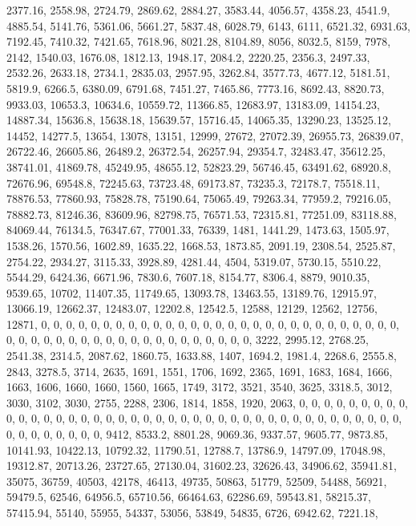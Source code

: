 \documentclass[
]{article}
\begin{document}
2377.16, 2558.98, 2724.79, 2869.62, 2884.27, 3583.44, 4056.57, 4358.23,
4541.9, 4885.54, 5141.76, 5361.06, 5661.27, 5837.48, 6028.79, 6143,
6111, 6521.32, 6931.63, 7192.45, 7410.32, 7421.65, 7618.96, 8021.28,
8104.89, 8056, 8032.5, 8159, 7978, 2142, 1540.03, 1676.08, 1812.13,
1948.17, 2084.2, 2220.25, 2356.3, 2497.33, 2532.26, 2633.18, 2734.1,
2835.03, 2957.95, 3262.84, 3577.73, 4677.12, 5181.51, 5819.9, 6266.5,
6380.09, 6791.68, 7451.27, 7465.86, 7773.16, 8692.43, 8820.73, 9933.03,
10653.3, 10634.6, 10559.72, 11366.85, 12683.97, 13183.09, 14154.23,
14887.34, 15636.8, 15638.18, 15639.57, 15716.45, 14065.35, 13290.23,
13525.12, 14452, 14277.5, 13654, 13078, 13151, 12999, 27672, 27072.39,
26955.73, 26839.07, 26722.46, 26605.86, 26489.2, 26372.54, 26257.94,
29354.7, 32483.47, 35612.25, 38741.01, 41869.78, 45249.95, 48655.12,
52823.29, 56746.45, 63491.62, 68920.8, 72676.96, 69548.8, 72245.63,
73723.48, 69173.87, 73235.3, 72178.7, 75518.11, 78876.53, 77860.93,
75828.78, 75190.64, 75065.49, 79263.34, 77959.2, 79216.05, 78882.73,
81246.36, 83609.96, 82798.75, 76571.53, 72315.81, 77251.09, 83118.88,
84069.44, 76134.5, 76347.67, 77001.33, 76339, 1481, 1441.29, 1473.63,
1505.97, 1538.26, 1570.56, 1602.89, 1635.22, 1668.53, 1873.85, 2091.19,
2308.54, 2525.87, 2754.22, 2934.27, 3115.33, 3928.89, 4281.44, 4504,
5319.07, 5730.15, 5510.22, 5544.29, 6424.36, 6671.96, 7830.6, 7607.18,
8154.77, 8306.4, 8879, 9010.35, 9539.65, 10702, 11407.35, 11749.65,
13093.78, 13463.55, 13189.76, 12915.97, 13066.19, 12662.37, 12483.07,
12202.8, 12542.5, 12588, 12129, 12562, 12756, 12871, 0, 0, 0, 0, 0, 0,
0, 0, 0, 0, 0, 0, 0, 0, 0, 0, 0, 0, 0, 0, 0, 0, 0, 0, 0, 0, 0, 0, 0, 0,
0, 0, 0, 0, 0, 0, 0, 0, 0, 0, 0, 0, 0, 0, 0, 0, 0, 0, 0, 3222, 2995.12,
2768.25, 2541.38, 2314.5, 2087.62, 1860.75, 1633.88, 1407, 1694.2,
1981.4, 2268.6, 2555.8, 2843, 3278.5, 3714, 2635, 1691, 1551, 1706,
1692, 2365, 1691, 1683, 1684, 1666, 1663, 1606, 1660, 1660, 1560, 1665,
1749, 3172, 3521, 3540, 3625, 3318.5, 3012, 3030, 3102, 3030, 2755,
2288, 2306, 1814, 1858, 1920, 2063, 0, 0, 0, 0, 0, 0, 0, 0, 0, 0, 0, 0,
0, 0, 0, 0, 0, 0, 0, 0, 0, 0, 0, 0, 0, 0, 0, 0, 0, 0, 0, 0, 0, 0, 0, 0,
0, 0, 0, 0, 0, 0, 0, 0, 0, 0, 0, 0, 0, 9412, 8533.2, 8801.28, 9069.36,
9337.57, 9605.77, 9873.85, 10141.93, 10422.13, 10792.32, 11790.51,
12788.7, 13786.9, 14797.09, 17048.98, 19312.87, 20713.26, 23727.65,
27130.04, 31602.23, 32626.43, 34906.62, 35941.81, 35075, 36759, 40503,
42178, 46413, 49735, 50863, 51779, 52509, 54488, 56921, 59479.5, 62546,
64956.5, 65710.56, 66464.63, 62286.69, 59543.81, 58215.37, 57415.94,
55140, 55955, 54337, 53056, 53849, 54835, 6726, 6942.62, 7221.18,
\end{document}
